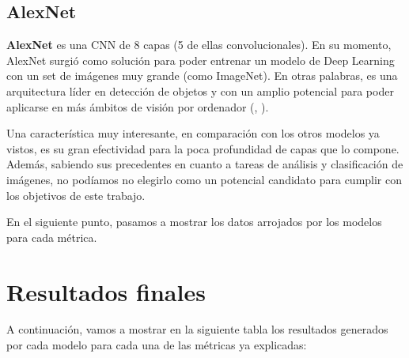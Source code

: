\subsection{AlexNet}

\textbf{AlexNet} es una \ac{CNN} de 8 capas (5 de ellas convolucionales). En su momento, AlexNet surgió como solución para poder entrenar un modelo de Deep Learning con un set de imágenes muy grande (como ImageNet). En otras palabras, es una arquitectura líder en detección de objetos y con un amplio potencial para poder aplicarse en más ámbitos de visión por ordenador (\cite{alexnet}, \cite{alexnet-2}).

Una característica muy interesante, en comparación con los otros modelos ya vistos, es su gran efectividad para la poca profundidad de capas que lo compone. Además, sabiendo sus precedentes en cuanto a tareas de análisis y clasificación de imágenes, no podíamos no elegirlo como un potencial candidato para cumplir con los objetivos de este trabajo.

En el siguiente punto, pasamos a mostrar los datos arrojados por los modelos para cada métrica.

\newpage

\section{Resultados finales}

A continuación, vamos a mostrar en la siguiente tabla los resultados generados por cada modelo para cada una de las métricas ya explicadas:

